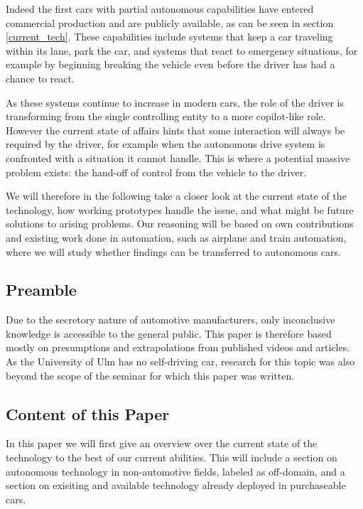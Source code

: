 \documentclass{acm_proc_article-sp}
\begin{document}
Indeed the first cars with partial autonomous capabilities have entered commercial production and are publicly available, as can be seen in section \ref{current_tech}.
These capabilities include systems that keep a car traveling within its lane, park the car, and systems that react to emergency situations, for example by beginning breaking the vehicle even before the driver has had a chance to react.

As these systems continue to increase in modern cars, the role of the driver is transforming from the single controlling entity to a more copilot-like role.
However the current state of affairs hints that some interaction will always be required by the driver, for example when the autonomous drive system is confronted with a situation it cannot handle.
This is where a potential massive problem exists: the hand-off of control from the vehicle to the driver.

We will therefore in the following take a closer look at the current state of the technology, how working prototypes handle the issue, and what might be future solutions to arising problems.
Our reasoning will be based on own contributions and existing work done in automation, such as airplane and train automation, where we will study whether findings can be transferred to autonomous cars.

\subsection{Preamble}

Due to the secretory nature of automotive manufacturers, only inconclusive knowledge is accessible to the general public.
This paper is therefore based mostly on presumptions and extrapolations from published videos and articles.
As the University of Ulm has no self-driving car, research for this topic was also beyond the scope of the seminar for which this paper was written.

\subsection{Content of this Paper}

In this paper we will first give an overview over the current state of the technology to the best of our current abilities.
This will include a section on autonomous technology in non-automotive fields, labeled as off-domain, and a section on exisiting and available technology already deployed in purchaseable cars.
\end{document}
